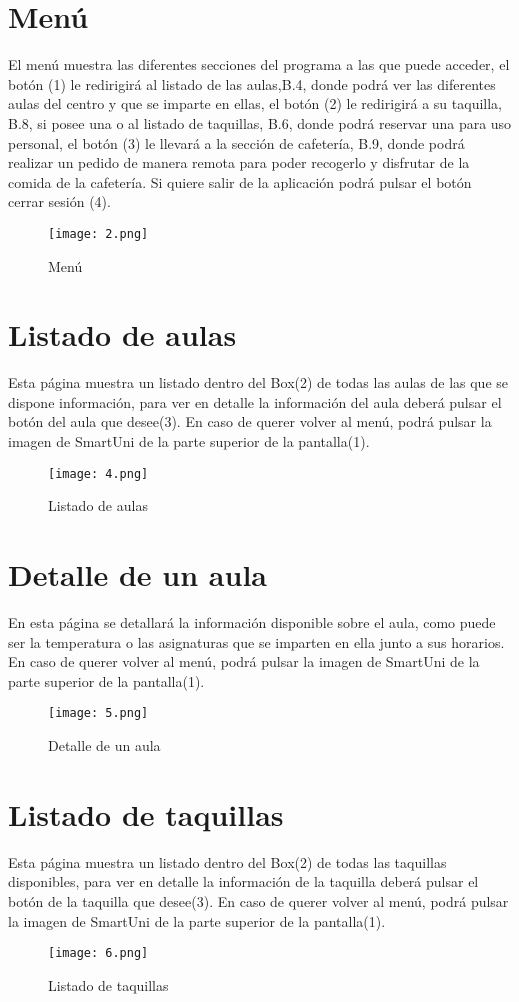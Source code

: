 \documentclass[12pt]{report}
\begin{document}
\begin{appendices}
\section{Menú}
El menú muestra las diferentes secciones del programa a las que puede acceder, el botón (1) le redirigirá al listado de las aulas,B.4, donde podrá ver las diferentes aulas del centro y que se imparte en ellas, el botón (2) le redirigirá a su taquilla, B.8, si posee una o al listado de taquillas, B.6, donde podrá reservar una para uso personal, el botón (3) le llevará a la sección de cafetería, B.9, donde podrá realizar un pedido de manera remota para poder recogerlo y disfrutar de la comida de la cafetería. Si quiere salir de la aplicación podrá pulsar el botón cerrar sesión (4).
\begin{figure}[H]
    \centering
    \texttt{[image: 2.png]}
    \caption{Menú}
    \label{fig:Figura3.4.3}
\end{figure}

\section{Listado de aulas}
Esta página muestra un listado dentro del Box(2) de todas las aulas de las que se dispone información, para ver en detalle la información del aula deberá pulsar el botón del aula que desee(3). En caso de querer volver al menú, podrá pulsar la imagen de SmartUni de la parte superior de la pantalla(1).
\begin{figure}[H]
    \centering
    \texttt{[image: 4.png]}
    \caption{Listado de aulas}
    \label{fig:Figura3.4.3}
\end{figure}

\section{Detalle de un aula}
En esta página se detallará la información disponible sobre el aula, como puede ser la temperatura o las asignaturas que se imparten en ella junto a sus horarios. En caso de querer volver al menú, podrá pulsar la imagen de SmartUni de la parte superior de la pantalla(1).
\begin{figure}[H]
    \centering
    \texttt{[image: 5.png]}
    \caption{Detalle de un aula}
    \label{fig:Figura3.4.3}
\end{figure}

\section{Listado de taquillas}
Esta página muestra un listado dentro del Box(2) de todas las taquillas disponibles, para ver en detalle la información de la taquilla deberá pulsar el botón de la taquilla que desee(3). En caso de querer volver al menú, podrá pulsar la imagen de SmartUni de la parte superior de la pantalla(1).
\begin{figure}[H]
    \centering
    \texttt{[image: 6.png]}
    \caption{Listado de taquillas}
    \label{fig:enter-label}
\end{figure}


\end{appendices}
\end{document}
